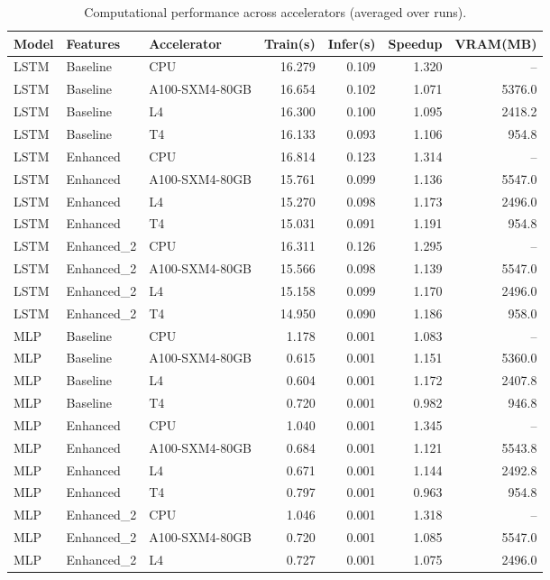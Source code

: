 \begin{table}
\caption{Computational performance across accelerators (averaged over runs).}
\label{tab:compute_all_models}
\begin{tabular}{lllrrrr}
\toprule
Model & Features & Accelerator & Train(s) & Infer(s) & Speedup & VRAM(MB) \\
\midrule
LSTM & Baseline & CPU & 16.279 & 0.109 & 1.320 & -- \\
LSTM & Baseline & A100-SXM4-80GB & 16.654 & 0.102 & 1.071 & 5376.0 \\
LSTM & Baseline & L4 & 16.300 & 0.100 & 1.095 & 2418.2 \\
LSTM & Baseline & T4 & 16.133 & 0.093 & 1.106 & 954.8 \\
LSTM & Enhanced & CPU & 16.814 & 0.123 & 1.314 & -- \\
LSTM & Enhanced & A100-SXM4-80GB & 15.761 & 0.099 & 1.136 & 5547.0 \\
LSTM & Enhanced & L4 & 15.270 & 0.098 & 1.173 & 2496.0 \\
LSTM & Enhanced & T4 & 15.031 & 0.091 & 1.191 & 954.8 \\
LSTM & Enhanced\_2 & CPU & 16.311 & 0.126 & 1.295 & -- \\
LSTM & Enhanced\_2 & A100-SXM4-80GB & 15.566 & 0.098 & 1.139 & 5547.0 \\
LSTM & Enhanced\_2 & L4 & 15.158 & 0.099 & 1.170 & 2496.0 \\
LSTM & Enhanced\_2 & T4 & 14.950 & 0.090 & 1.186 & 958.0 \\
MLP & Baseline & CPU & 1.178 & 0.001 & 1.083 & -- \\
MLP & Baseline & A100-SXM4-80GB & 0.615 & 0.001 & 1.151 & 5360.0 \\
MLP & Baseline & L4 & 0.604 & 0.001 & 1.172 & 2407.8 \\
MLP & Baseline & T4 & 0.720 & 0.001 & 0.982 & 946.8 \\
MLP & Enhanced & CPU & 1.040 & 0.001 & 1.345 & -- \\
MLP & Enhanced & A100-SXM4-80GB & 0.684 & 0.001 & 1.121 & 5543.8 \\
MLP & Enhanced & L4 & 0.671 & 0.001 & 1.144 & 2492.8 \\
MLP & Enhanced & T4 & 0.797 & 0.001 & 0.963 & 954.8 \\
MLP & Enhanced\_2 & CPU & 1.046 & 0.001 & 1.318 & -- \\
MLP & Enhanced\_2 & A100-SXM4-80GB & 0.720 & 0.001 & 1.085 & 5547.0 \\
MLP & Enhanced\_2 & L4 & 0.727 & 0.001 & 1.075 & 2496.0 \\

\end{tabular}
\end{table}
